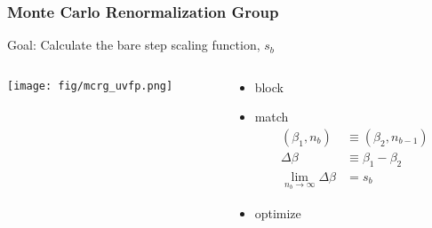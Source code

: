 \begin{frame}
  \frametitle{Monte Carlo Renormalization Group}
  Goal:  Calculate the bare step scaling function, $s_b$
  \vspace{24pt}
  \begin{columns}[T]
    \begin{column}{.5\textwidth}
      \begin{block}{}
        \texttt{[image: fig/mcrg\_uvfp.png]}
      \end{block}
    \end{column}
    \begin{column}{.5\textwidth}
      \begin{itemize}
        \item block
        \item match
        \begin{equation*}
          \begin{aligned}
            (\beta_1,n_b) &\equiv(\beta_2,n_{b-1})\\
            \Delta\beta &\equiv \beta_1-\beta_2\\
            \lim_{n_b\to\infty} \Delta\beta &= s_b
          \end{aligned}
        \end{equation*}
        \item optimize
      \end{itemize}
    \end{column}
  \end{columns}
\end{frame}

